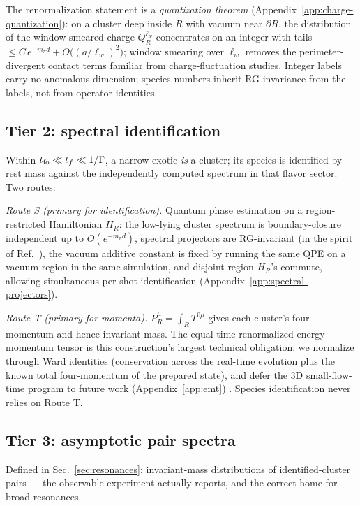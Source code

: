 The renormalization statement is a \emph{quantization theorem}
(Appendix~\ref{app:charge-quantization}): on a cluster deep inside $R$
with vacuum near $\partial R$, the distribution of the window-smeared
charge $Q_R^{\ell_w}$ concentrates on an integer with tails
$\le C\,e^{-m_\pi d} + O\big((a/\ell_w)^2\big)$; window smearing over
$\ell_w$ removes the perimeter-divergent contact terms familiar from
charge-fluctuation studies.  Integer labels carry no anomalous dimension;
species numbers inherit RG-invariance from the labels, not from operator
identities.

\subsection{Tier 2: spectral identification}
\label{sec:tier2}

Within $t_{\rm fo}\ll t_f\ll 1/\Gamma$, a narrow exotic \emph{is} a
cluster; its species is identified by rest mass against the independently
computed spectrum in that flavor sector.  Two routes:

\emph{Route S (primary for identification).}  Quantum phase estimation
\cite{Kitaev:1995qy,Choi:2020pdg} on a region-restricted Hamiltonian
$H_R$: the low-lying cluster spectrum is boundary-closure independent up
to $O(e^{-m_\pi d})$, spectral projectors are RG-invariant (in the spirit
of Ref.~\cite{Giusti:2008vb}), the vacuum additive constant is fixed by
running the same QPE on a vacuum region in the same simulation, and
disjoint-region $H_R$'s commute, allowing simultaneous per-shot
identification (Appendix~\ref{app:spectral-projectors}).

\emph{Route T (primary for momenta).}  $P^\mu_R=\int_R T^{0\mu}$ gives
each cluster's four-momentum and hence invariant mass.  The equal-time
renormalized energy-momentum tensor is this construction's largest
technical obligation: we normalize through Ward identities (conservation
across the real-time evolution plus the known total four-momentum of the
prepared state), and defer the 3D small-flow-time program to future work
(Appendix~\ref{app:emt}) \cite{Suzuki:2013gza,Makino:2014taa,
DallaBrida:2020gux}.  Species identification never relies on Route T.

\subsection{Tier 3: asymptotic pair spectra}
\label{sec:tier3}

Defined in Sec.~\ref{sec:resonances}: invariant-mass distributions of
identified-cluster pairs --- the observable experiment actually reports,
and the correct home for broad resonances.


